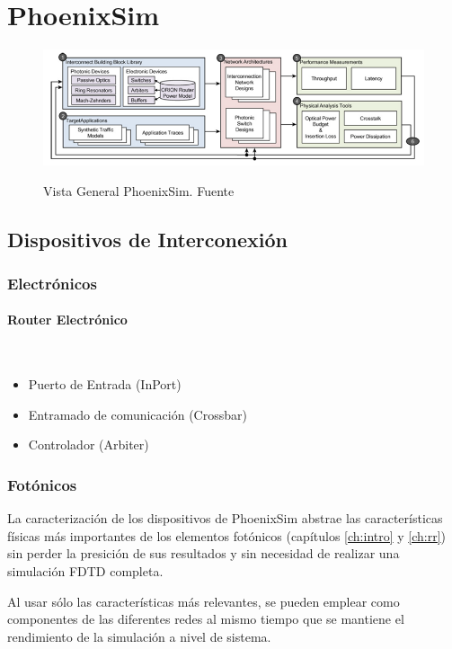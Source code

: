 \section{PhoenixSim}

\begin{figure}[H]
\caption{Vista General PhoenixSim. Fuente \cite{Chan2011}}
\centering
\includegraphics[width=1.0\textwidth,natwidth=790,natheight=240]{figs/overview.png}
\label{fig:phoenix_ovw}
\end{figure}

\subsection{Dispositivos de Interconexión}
\subsubsection{Electrónicos}

\paragraph{Router Electrónico}~\\
\begin{itemize}
\item Puerto de Entrada (InPort)
\item Entramado de comunicación (Crossbar)
\item Controlador (Arbiter)
\end{itemize} 

\subsubsection{Fotónicos}
La caracterización  de los dispositivos de PhoenixSim abstrae las características físicas más importantes de los elementos fotónicos (capítulos \ref{ch:intro} y \ref{ch:rr}) sin perder la presición de sus resultados y sin necesidad de realizar una simulación FDTD completa. 

Al usar sólo las características más relevantes, se pueden emplear como componentes de las diferentes redes al mismo tiempo que se mantiene el rendimiento de la simulación a nivel de sistema.

